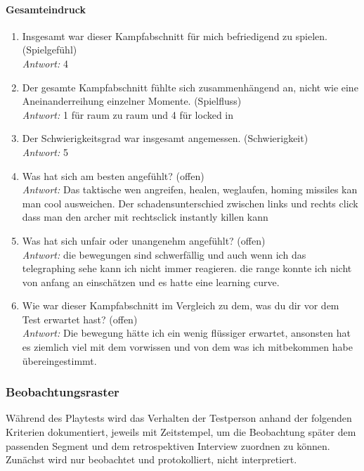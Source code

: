 \documentclass[../Main.tex]{subfiles}
\begin{document}
\paragraph{Gesamteindruck}
\begin{enumerate}[label=\textbf{Q\arabic*}, leftmargin=1.5cm, itemsep=0.8em, resume]
    \item Insgesamt war dieser Kampfabschnitt für mich befriedigend zu spielen. \hfill (Spielgefühl) \\
    \textit{Antwort:} 4
    \item Der gesamte Kampfabschnitt fühlte sich zusammenhängend an, nicht wie eine Aneinanderreihung einzelner Momente. \hfill (Spielfluss) \\
    \textit{Antwort:} 1 für raum zu raum und 4 für locked in
    \item Der Schwierigkeitsgrad war insgesamt angemessen. \hfill (Schwierigkeit) \\
    \textit{Antwort:} 5
    \item Was hat sich am besten angefühlt? \hfill (offen) \\
    \textit{Antwort:} Das taktische wen angreifen, healen, weglaufen, homing missiles kan man cool ausweichen. Der schadensunterschied zwischen links und rechts click dass man den archer mit rechtsclick instantly killen kann
    \item Was hat sich unfair oder unangenehm angefühlt? \hfill (offen) \\
    \textit{Antwort:} die bewegungen sind schwerfällig und auch wenn ich das telegraphing sehe kann ich nicht immer reagieren. die range konnte ich nicht von anfang an einschätzen und es hatte eine learning curve.
    \item Wie war dieser Kampfabschnitt im Vergleich zu dem, was du dir vor dem Test erwartet hast? \hfill (offen) \\
    \textit{Antwort:} Die bewegung hätte ich ein wenig flüssiger erwartet, ansonsten hat es ziemlich viel mit dem vorwissen und von dem was ich mitbekommen habe übereingestimmt.
\end{enumerate}

\subsubsection{Beobachtungsraster}

Während des Playtests wird das Verhalten der Testperson anhand der folgenden Kriterien dokumentiert, jeweils mit Zeitstempel, um die Beobachtung später dem passenden Segment und dem retrospektiven Interview zuordnen zu können. Zunächst wird nur beobachtet und protokolliert, nicht interpretiert.
\end{document}
